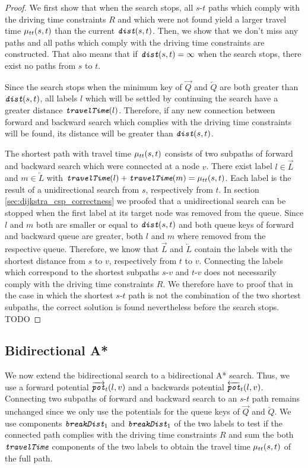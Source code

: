 \begin{proof}
	We first show that when the search stops, all $s$-$t$ paths which comply with the driving time constraints $R$ and which were not found yield a larger travel time $\mu_{tt}(s,t)$ than the current $\texttt{\itshape dist}(s,t)$. Then, we show that we don't miss any paths and all paths which comply with the driving time constraints are constructed. That also means that if $\texttt{\itshape dist}(s,t) = \infty$ when the search stops, there exist no paths from $s$ to $t$.

	Since the search stops when the minimum key of $\overrightarrow{Q}$ and $\overleftarrow{Q}$ are both greater than $\texttt{\itshape dist}(s,t)$, all labels $l$ which will be settled by continuing the search have a greater distance $\texttt{\itshape travelTime}(l)$. Therefore, if any new connection between forward and backward search which complies with the driving time constraints will be found, its distance will be greater than $\texttt{\itshape dist}(s,t)$.

	The shortest path with travel time $\mu_{tt}(s,t)$ consists of two subpaths of forward and backward search which were connected at a node $v$. There exist label $l \in \overrightarrow{L}$ and $m \in \overleftarrow{L}$ with $\texttt{\itshape travelTime}(l) + \texttt{\itshape travelTime}(m) = \mu_{tt}(s,t)$. Each label is the result of a unidirectional search from $s$, respectively from $t$. In section \ref{sec:dijkstra_csp_correctness} we proofed that a unidirectional search can be stopped when the first label at its target node was removed from the queue. Since $l$ and $m$ both are smaller or equal to $\texttt{\itshape dist}(s,t)$ and both queue keys of forward and backward queue are greater, both $l$ and $m$ where removed from the respective queue. Therefore, we know that $\overrightarrow{L}$ and $\overleftarrow{L}$ contain the labels with the shortest distance from $s$ to $v$, respectively from $t$ to $v$. Connecting the labels which correspond to the shortest subpaths $s$-$v$ and $t$-$v$ does not necessarily comply with the driving time constraints $R$. We therefore have to proof that in the case in which the shortest $s$-$t$ path is not the combination of the two shortest subpaths, the correct solution is found nevertheless before the search stops. TODO
\end{proof}

\subsection{Bidirectional A*}
We now extend the bidirectional search to a bidirectional A* search. Thus, we use a forward potential $\overrightarrow{\texttt{\itshape pot}}_t(l,v)$ and a backwards potential $\overleftarrow{\texttt{\itshape pot}}_t(l,v)$. Connecting two subpaths of forward and backward search to an $s$-$t$ path remains unchanged since we only use the potentials for the queue keys of $\overrightarrow{Q}$ and $\overleftarrow{Q}$. We use components $\texttt{\itshape breakDist}_1$ and $\texttt{\itshape breakDist}_1$ of the two labels to test if the connected path complies with the driving time constraints $R$ and sum the both $\texttt{\itshape travelTime}$ components of the two labels to obtain the travel time $\mu_{tt}(s,t)$ of the full path.

